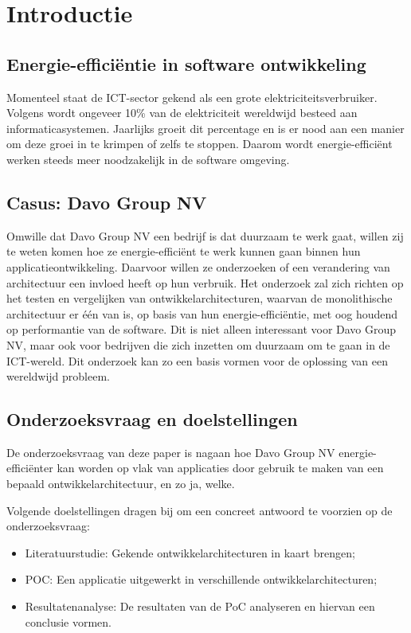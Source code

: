 
\section{Introductie}%
\label{sec:introductie}
\subsection{Energie-efficiëntie in software ontwikkeling}
Momenteel staat de ICT-sector gekend als een grote elektriciteitsverbruiker. Volgens \textcite{Gelenbe2023} wordt ongeveer 10\% van de elektriciteit wereldwijd besteed aan informaticasystemen. Jaarlijks groeit dit percentage en is er nood aan een manier om deze groei in te krimpen of zelfs te stoppen. Daarom wordt energie-efficiënt werken steeds meer noodzakelijk in de software omgeving.  

\subsection{Casus: Davo Group NV}
Omwille dat Davo Group NV een bedrijf is dat duurzaam te werk gaat, willen zij te weten komen hoe ze energie-efficiënt te werk kunnen gaan binnen hun applicatieontwikkeling. Daarvoor willen ze onderzoeken of een verandering van architectuur een invloed heeft op hun verbruik. Het onderzoek zal zich richten op het testen en vergelijken van ontwikkelarchitecturen, waarvan de monolithische architectuur er één van is, op basis van hun energie-efficiëntie, met oog houdend op performantie van de software. Dit is niet alleen interessant voor Davo Group NV, maar ook voor bedrijven die zich inzetten om duurzaam om te gaan in de ICT-wereld. Dit onderzoek kan zo een basis vormen voor de oplossing van een wereldwijd probleem.


\subsection{Onderzoeksvraag en doelstellingen}
De onderzoeksvraag van deze paper is nagaan hoe Davo Group NV energie-efficiënter kan worden op vlak van applicaties door gebruik te maken van een bepaald ontwikkelarchitectuur, en zo ja, welke.

Volgende doelstellingen dragen bij om een concreet antwoord te voorzien op de onderzoeksvraag:

\begin{itemize}
    \item Literatuurstudie: Gekende ontwikkelarchitecturen in kaart brengen;
    \item POC: Een applicatie uitgewerkt in verschillende ontwikkelarchitecturen;
    \item Resultatenanalyse: De resultaten van de PoC analyseren en hiervan een conclusie vormen.
\end{itemize}

